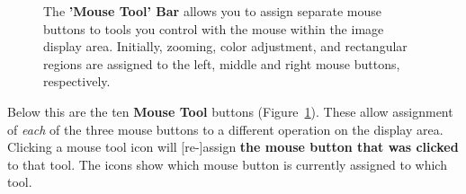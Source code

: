 \begin{figure}[h!]
\begin{center}
\caption{\label{fig:viewer_mousetoolbar} The 
{\bf 'Mouse Tool' Bar} allows you to assign separate mouse buttons to
tools you control with the mouse within the image display area.  Initially,
zooming, color adjustment, and rectangular regions are assigned to the left,
middle and right mouse buttons,
respectively.}
\hrulefill
\end{center}
\end{figure}

Below this are the ten {\bf Mouse Tool} buttons
(Figure~\ref{fig:viewer_mousetoolbar}). These allow assignment of
{\it each} of the three mouse buttons to a different operation on the display
area. Clicking a mouse tool icon will [re-]assign {\bf the mouse button that
was clicked} to that tool.  The icons show which mouse button is currently
assigned to which tool.  

